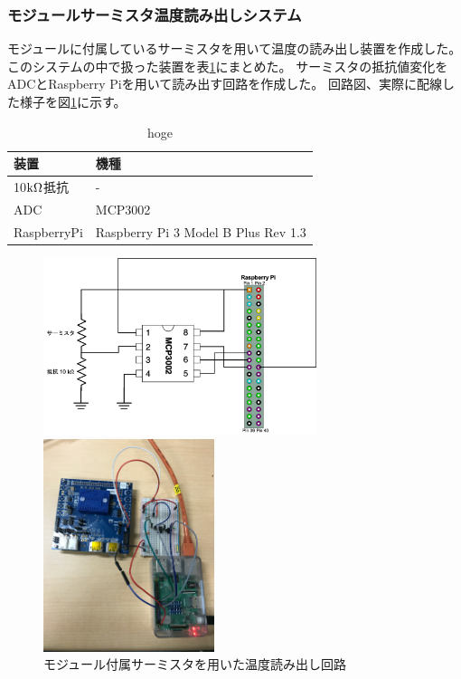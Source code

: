 \subsubsection{モジュールサーミスタ温度読み出しシステム}
モジュールに付属しているサーミスタを用いて温度の読み出し装置を作成した。
このシステムの中で扱った装置を表\ref{demo_temp_device}にまとめた。
サーミスタの抵抗値変化をADCとRaspberry Piを用いて読み出す回路を作成した。
回路図、実際に配線した様子を図\ref{demo_temp_circit_pic}に示す。

\begin{table}[tbp]
\begin{center}
\caption[hoge]{hoge}
\label{demo_temp_device}
  \begin{tabular}{|ll|} \hline
    装置 & 機種 \\ \hline
    10$\rm{k\Omega}$抵抗 & - \\
    ADC & MCP3002\cite{3} \\  
    RaspberryPi &  Raspberry Pi 3 Model B Plus Rev 1.3\cite{4} \\ \hline 
  \end{tabular}
\end{center}
\end{table}

\begin{figure}[h]\centering
  \begin{minipage}{0.5\hsize}
    \includegraphics[width=8cm]{temp_circit}
  \end{minipage}
  \begin{minipage}{0.5\hsize}
    \includegraphics[width=5cm]{temp_circit_pic}
  \end{minipage}
\caption[モジュール付属サーミスタを用いた温度読み出し回路]{モジュール付属サーミスタを用いた温度読み出し回路}
\label{demo_temp_circit_pic}
\end{figure}

